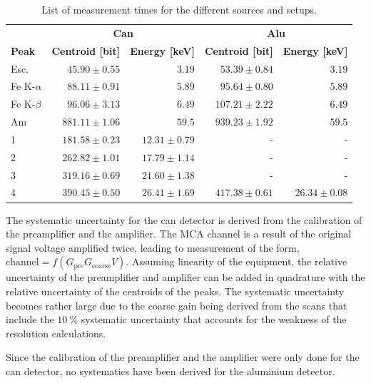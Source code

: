 \begin{table}[htbp]
  \centering
\begin{tabular}{lrrrr}
              & \multicolumn{2}{c}{\textbf{Can}} & \multicolumn{2}{c}{\textbf{Alu}} \\
\textbf{Peak} & \textbf{Centroid [bit]}      & \textbf{Energy [keV]}      & \textbf{Centroid [bit]}     & \textbf{Energy [keV]}     \\ \hline
Esc.          & $ 45.90 \pm 0.55$ & $ 3.19$          & $ 53.39 \pm 0.84$ & $ 3.19$          \\
Fe K-$\alpha$ & $ 88.11 \pm 0.91$ & $ 5.89$          & $ 95.64 \pm 0.80$ & $ 5.89$          \\
Fe K-$\beta$  & $ 96.06 \pm 3.13$ & $ 6.49$          & $107.21 \pm 2.22$ & $ 6.49$          \\
Am            & $881.11 \pm 1.06$ & $ 59.5$          & $939.23 \pm 1.92$ & $ 59.5$          \\
1             & $181.58 \pm 0.23$ & $12.31 \pm 0.79$ & -                 & -                \\
2             & $262.82 \pm 1.01$ & $17.79 \pm 1.14$ & -                 & -                \\
3             & $319.16 \pm 0.69$ & $21.60 \pm 1.38$ & -                 & -                \\
4             & $390.45 \pm 0.50$ & $26.41 \pm 1.69$ & $417.38 \pm 0.61$ & $26.34 \pm 0.08$ \\ \hline
\end{tabular}
\caption{List of measurement times for the different sources and setups.}
\label{tab:peakschannelenergies}
\end{table}

The systematic uncertainty for the can detector is derived from the calibration of the preamplifier and the amplifier.
The MCA channel is a result of the original signal voltage amplified twice, leading to measurement of the form, $\textrm{channel} = f(G_\mathrm{pre} G_\mathrm{coarse} V)$.
Assuming linearity of the equipment, the relative uncertainty of the preamplifier and amplifier can be added in quadrature with the relative uncertainty of the centroids of the peaks.
The systematic uncertainty becomes rather large due to the coarse gain being derived from the scans that include the $\SI{10}{\percent}$ systematic uncertainty that accounts for the weakness of the resolution calculations.

Since the calibration of the preamplifier and the amplifier were only done for the can detector, no systematics have been derived for the aluminium detector.



